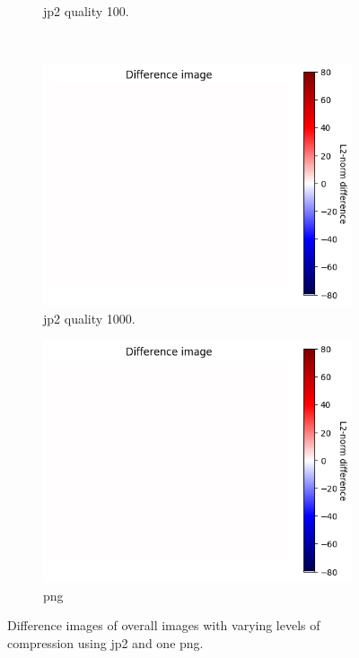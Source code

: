 \begin{figure}[htb]
\begin{subfigure}[b]{0.49\textwidth}
            \caption{\gls{jp2} quality 100.}
            \label{fig:img_quality_heatmap_100}
        \end{subfigure}
        \\
        \begin{subfigure}[b]{0.49\textwidth}
            \centering
            \includegraphics[width=\textwidth]{doc/thesis/0_figures/compare_quality/set1/heatmap/jp2_1000_diff_heatmap.png}
            \caption{\gls{jp2} quality 1000.}
            \label{fig:img_quality_heatmap_1000}
        \end{subfigure}
        \begin{subfigure}[b]{0.49\textwidth}
            \centering
            \includegraphics[width=\textwidth]{doc/thesis/0_figures/compare_quality/set1/heatmap/png_diff_heatmap.png}
            \caption{\gls{png}}
            \label{fig:img_quality_heatmap_png}
        \end{subfigure}
    \caption{Difference images of overall images with varying levels of compression using \gls{jp2} and one \gls{png}.}
    \label{fig:img_quality_heatmap}
\end{figure}


